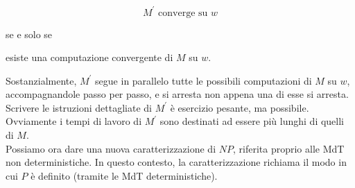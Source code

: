 $$
    M^{\prime} \text { converge su } w
$$

se e solo se

\begin{center}
    esiste una computazione convergente di $M$ su $w$.
\end{center}

Sostanzialmente, $M^{\prime}$ segue in parallelo tutte le possibili computazioni
di $M$ su $w$, accompagnandole passo per passo, e si arresta non appena una di
esse si arresta. Scrivere le istruzioni dettagliate di $M^{\prime}$ è esercizio
pesante, ma possibile. Ovviamente i tempi di lavoro di $M^{\prime}$ sono
destinati ad essere più lunghi di quelli di $M$.\\
Possiamo ora dare una nuova caratterizzazione di $N P$, riferita proprio alle
MdT non deterministiche. In questo contesto, la caratterizzazione richiama il
modo in cui $P$ è definito (tramite le MdT deterministiche).

